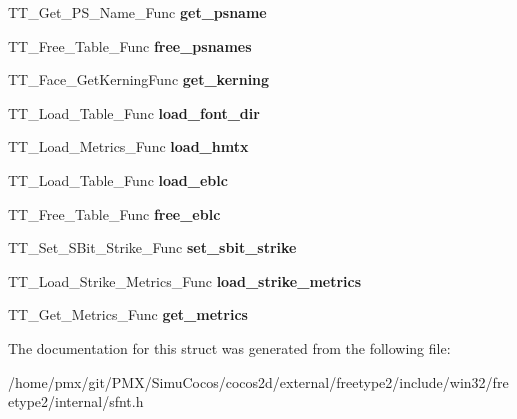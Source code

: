 \begin{DoxyCompactItemize}
\item 
\mbox{\label{structSFNT__Interface___a08c388ef2f20f9452600fffeaf051183}} 
T\+T\+\_\+\+Get\+\_\+\+P\+S\+\_\+\+Name\+\_\+\+Func {\bfseries get\+\_\+psname}
\item 
\mbox{\label{structSFNT__Interface___a4d73e810a4e0bc018b7ca935822e4eec}} 
T\+T\+\_\+\+Free\+\_\+\+Table\+\_\+\+Func {\bfseries free\+\_\+psnames}
\item 
\mbox{\label{structSFNT__Interface___a73b00cba7226978783efdcc928330eb9}} 
T\+T\+\_\+\+Face\+\_\+\+Get\+Kerning\+Func {\bfseries get\+\_\+kerning}
\item 
\mbox{\label{structSFNT__Interface___a30af6672f274638bb0b0c7546e58d470}} 
T\+T\+\_\+\+Load\+\_\+\+Table\+\_\+\+Func {\bfseries load\+\_\+font\+\_\+dir}
\item 
\mbox{\label{structSFNT__Interface___aea4dd40109dec64e4feb53462d3a54d0}} 
T\+T\+\_\+\+Load\+\_\+\+Metrics\+\_\+\+Func {\bfseries load\+\_\+hmtx}
\item 
\mbox{\label{structSFNT__Interface___a2b6d7cb72644cc5e36ca67e4aeed55e1}} 
T\+T\+\_\+\+Load\+\_\+\+Table\+\_\+\+Func {\bfseries load\+\_\+eblc}
\item 
\mbox{\label{structSFNT__Interface___a043a22a8dd45b30dc6e8e5cb7be8dc44}} 
T\+T\+\_\+\+Free\+\_\+\+Table\+\_\+\+Func {\bfseries free\+\_\+eblc}
\item 
\mbox{\label{structSFNT__Interface___ab9e73d79753ea4a492c1cf66aee8e518}} 
T\+T\+\_\+\+Set\+\_\+\+S\+Bit\+\_\+\+Strike\+\_\+\+Func {\bfseries set\+\_\+sbit\+\_\+strike}
\item 
\mbox{\label{structSFNT__Interface___a285149d0d4f00f2b862e3db45205cfa0}} 
T\+T\+\_\+\+Load\+\_\+\+Strike\+\_\+\+Metrics\+\_\+\+Func {\bfseries load\+\_\+strike\+\_\+metrics}
\item 
\mbox{\label{structSFNT__Interface___a32ceff5842782c1cf7d7992e40cc858e}} 
T\+T\+\_\+\+Get\+\_\+\+Metrics\+\_\+\+Func {\bfseries get\+\_\+metrics}
\end{DoxyCompactItemize}


The documentation for this struct was generated from the following file\+:\begin{DoxyCompactItemize}
\item 
/home/pmx/git/\+P\+M\+X/\+Simu\+Cocos/cocos2d/external/freetype2/include/win32/freetype2/internal/sfnt.\+h\end{DoxyCompactItemize}
